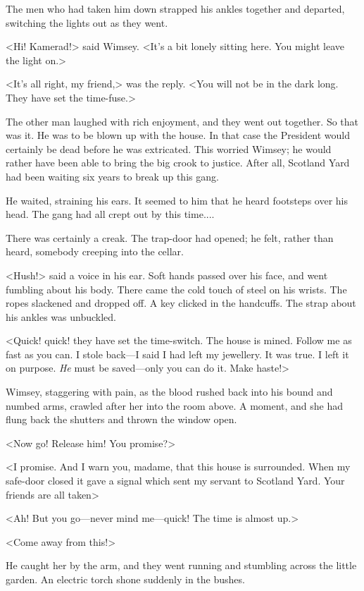 The men who had taken him down strapped his ankles together and departed, switching the lights out as they went.

<Hi! Kamerad!> said Wimsey. <It's a bit lonely sitting here. You might leave the light on.>

<It's all right, my friend,> was the reply. <You will not be in the dark long. They have set the time-fuse.>

The other man laughed with rich enjoyment, and they went out together. So that was it. He was to be blown up with the house. In that case the President would certainly be dead before he was extricated. This worried Wimsey; he would rather have been able to bring the big crook to justice. After all, Scotland Yard had been waiting six years to break up this gang.

He waited, straining his ears. It seemed to him that he heard footsteps over his head. The gang had all crept out by this time....

There was certainly a creak. The trap-door had opened; he felt, rather than heard, somebody creeping into the cellar.

<Hush!> said a voice in his ear. Soft hands passed over his face, and went fumbling about his body. There came the cold touch of steel on his wrists. The ropes slackened and dropped off. A key clicked in the handcuffs. The strap about his ankles was unbuckled.

<Quick! quick! they have set the time-switch. The house is mined. Follow me as fast as you can. I stole back—I said I had left my jewellery. It was true. I left it on purpose. \textit{He} must be saved—only you can do it. Make haste!>

Wimsey, staggering with pain, as the blood rushed back into his bound and numbed arms, crawled after her into the room above. A moment, and she had flung back the shutters and thrown the window open.

<Now go! Release him! You promise?>

<I promise. And I warn you, madame, that this house is surrounded. When my safe-door closed it gave a signal which sent my servant to Scotland Yard. Your friends are all taken\longdash>

<Ah! But you go—never mind me—quick! The time is almost up.>

<Come away from this!>

He caught her by the arm, and they went running and stumbling across the little garden. An electric torch shone suddenly in the bushes.

